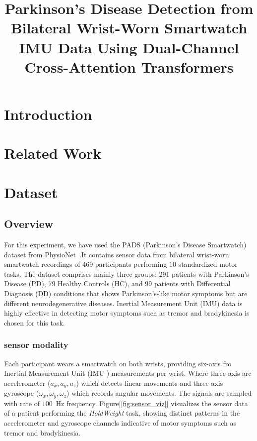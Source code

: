 \documentclass[conference]{IEEEtran}
\title{Parkinson's Disease Detection from Bilateral Wrist-Worn Smartwatch IMU Data Using Dual-Channel Cross-Attention Transformers}
\author{
  \IEEEauthorblockN{Author Name}
  \IEEEauthorblockA{\\
  University Name \\
  \texttt{author@email.edu}}
}
\begin{document}
\maketitle

\begin{abstract}
\end{abstract}

\section{Introduction}



\section{Related Work}


\section{Dataset}

\subsection{Overview}
For this experiment, we have used the PADS (Parkinson's Disease Smartwatch) dataset from PhysioNet~\cite{ref}.It contains sensor data from bilateral wrist-worn smartwatch recordings of 469 participants performing $10$ standardized motor tasks. The dataset comprises mainly three  groups: 291 patients with Parkinson's Disease (PD), 79 Healthy Controls (HC), and 99 patients with Differential Diagnosis (DD) conditions that shows Parkinson's-like motor symptoms but are different neurodegenerative diseases. Inertial Measurement Unit (IMU) data is highly effective in detecting motor symptoms such as tremor and bradykinesia is chosen for this task. 
\subsubsection{sensor modality}
Each participant wears a smartwatch on both wrists, providing six-axis fro Inertial Measurement Unit  (IMU ) measurements per wrist. Where three-axis are accelerometer ($a_x, a_y, a_z$) which detects linear movements and three-axis gyroscope ($\omega_x, \omega_y, \omega_z$) which records angular movements. The signals are sampled with rate of $100$~Hz frequency.
Figure[\ref{fig:sensor_viz}] visualizes the sensor data of a patient performing the \textit{HoldWeight} task, showing distinct patterns in the accelerometer and gyroscope channels indicative of motor symptoms such as tremor and bradykinesia.
\end{document}
